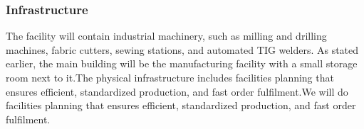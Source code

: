 \documentclass{article}
\begin{document}
  \subsubsection{Infrastructure}
   The facility will contain industrial machinery, such as milling and drilling machines, fabric cutters, sewing stations, and automated TIG welders. As stated earlier, the main building will be the manufacturing facility with a small storage room next to it.The physical infrastructure includes facilities planning that ensures efficient, standardized production, and fast order fulfilment.We will do facilities planning that ensures efficient, standardized production, and fast order fulfilment.
\end{document}
